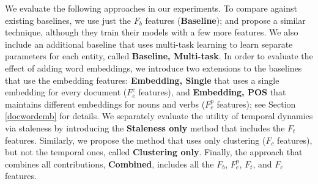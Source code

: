 \documentclass{article}
\begin{document}
We evaluate the following approaches in our experiments.
  To compare against existing baselines, we use just the $F_b$ features ({\textbf{Baseline}}); \citet{jingang13} and \citet{bellogin13} propose a similar technique, although they train their models with a few more features.
  We also include an additional baseline that uses multi-task learning \cite{Caruana93multitasklearning} to learn separate parameters for each entity, called {\textbf{Baseline, Multi-task}}.
  In order to evaluate the effect of adding word embeddings, we introduce two extensions to the baselines that use the embedding features: {\textbf{Embedding, Single}} that uses a single embedding for every document ($F_e^c$ features), and {\textbf{Embedding, POS}} that maintains different embeddings for nouns and verbs ($F_e^p$ features);
  see Section \ref{docwordemb} for details.
  We separately evaluate the utility of temporal dynamics via staleness by introducing the {\textbf{Staleness only}} method that includes the $F_t$ features.
  Similarly, we propose the method that uses only clustering ($F_c$ features), but not the temporal ones, called {\textbf{Clustering only}}.
  Finally, the approach that combines all contributions, {\textbf{Combined}}, includes all the $F_b$, $F_e^p$, $F_t$, and $F_c$ features.
\end{document}
